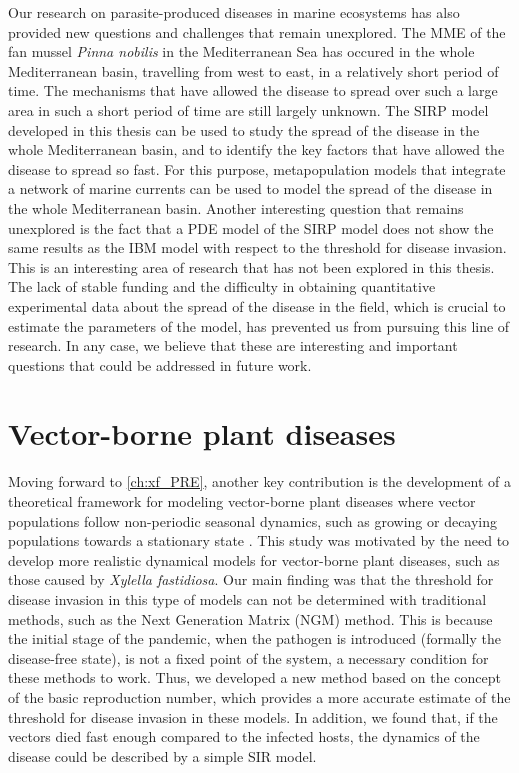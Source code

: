 Our research on parasite-produced diseases in marine ecosystems has also
provided new questions and challenges that remain unexplored. The MME of the
fan mussel \textit{Pinna nobilis} in the Mediterranean Sea has occured
in the whole Mediterranean basin, travelling from west to east, in a relatively
short period of time. The mechanisms that have allowed the disease to spread
over such a large area in such a short period of time are still largely
unknown. The SIRP model developed in this thesis can be used to study the
spread of the disease in the whole Mediterranean basin, and to identify the key
factors that have allowed the disease to spread so fast. For this purpose,
metapopulation models that integrate a network of marine currents can be used
to model the spread of the disease in the whole Mediterranean basin. Another
interesting question that remains unexplored is the fact that a PDE model of
the SIRP model does not show the same results as the IBM model with respect to
the threshold for disease invasion. This is an interesting area of research
that has not been explored in this thesis. The lack of stable funding and
the difficulty in obtaining quantitative experimental data about the spread
of the disease in the field, which is crucial to estimate the parameters of the
model, has prevented us from pursuing this line of research. In any case, we
believe that these are interesting and important questions that could be
addressed in future work.

\section{Vector-borne plant diseases}

Moving forward to \cref{ch:xf_PRE}, another key contribution is the
development of a theoretical framework for modeling vector-borne plant diseases
where vector populations follow non-periodic seasonal dynamics, such as growing
or decaying populations towards a stationary state
\cite{GimenezRomero2022_PRE}. This study was motivated by the need to develop
more realistic dynamical models for vector-borne plant diseases, such as those
caused by \textit{Xylella fastidiosa}. Our main finding was that the threshold
for disease invasion in this type of models can not be determined with
traditional methods, such as the Next Generation Matrix (NGM) method. This is
because the initial stage of the pandemic, when the pathogen is introduced
(formally the disease-free state), is not a fixed point of the system, a
necessary condition for these methods to work. Thus, we developed a
new method based on the concept of the basic reproduction number, which
provides a more accurate estimate of the threshold for disease invasion in
these models. In addition, we found that, if the vectors died fast enough
compared to the infected hosts, the dynamics of the disease could be described
by a simple SIR model.

